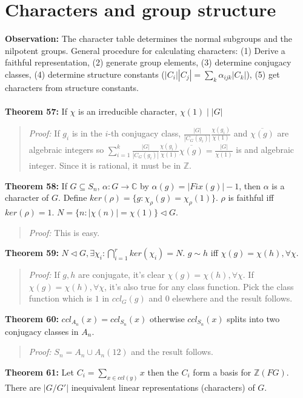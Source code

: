{\section {Characters and group structure}
{\bf Observation:}
The character table determines the normal subgroups and the nilpotent groups.
General procedure for calculating characters: (1) Derive a faithful representation,
(2) generate group elements, (3) determine conjugacy classes, (4) determine structure
constants ($|C_i||C_j|= \sum_k \alpha_{ijk} |C_k|$), (5) get characters from structure
constants.
\\
\\
{\bf Theorem 57:}
If $\chi$ is an irreducible character, $\chi(1) \mid |G|$ 
\begin{quote}
\emph{Proof:}
If $g_i$ is in the $i$-th conjugacy class,
${\frac {|G|} {|C_G(g_i)|}} {\frac {\chi(g_i)} {\chi(1)}}$ and ${\overline {\chi(g)}}$
are algebraic integers so
$\sum_{i=1}^k {\frac {|G|} {|C_G(g_i)|}} {\frac {\chi(g_i)} {\chi(1)}}{\overline {\chi(g)}}
={\frac {|G|} {\chi(1)}}$ is and algebraic integer.  Since it is rational, it must be in
${\mathbb Z}$.
\end{quote}
{\bf Theorem 58:}
If $G \subseteq S_n$, $\alpha: G \rightarrow {\mathbb C}$ by $\alpha(g)= |Fix(g)|-1$,
then $\alpha$ is a character of $G$. Define $ker(\rho)= \{g: \chi_{\rho}(g)= \chi_{\rho}(1) \}$.
$\rho$ is faithful iff $ker(\rho)=1$.  $N= \{n: |\chi(n)|= \chi(1) \} \lhd G$. 
\begin{quote}
\emph{Proof:}  
This is easy.
\end{quote}
{\bf Theorem 59:}
$N \lhd G, \exists \chi_i: \bigcap_{i=1}^r ker(\chi_i) =N$.  
$g \sim h$ iff $\chi(g) = \chi(h), \forall  \chi$.  
\begin{quote}
\emph{Proof:}  
If $g, h$ are conjugate, it's clear $\chi(g) = \chi(h), \forall  \chi$.
If $\chi(g) = \chi(h), \forall  \chi$, it's also true for any class function.  Pick the class
function which is $1$ in $ccl_G(g)$ and $0$ elsewhere and the result follows.
\end{quote}
{\bf Theorem 60:}
$ccl_{A_n}(x)=ccl_{S_n}(x)$ otherwise
$ccl_{S_n}(x)$ splits into two conjugacy classes in $A_n$.
\begin{quote}
\emph{Proof:}  
$S_n = A_n \cup A_n (12)$ and the result follows.
\end{quote}
{\bf Theorem 61:}
Let $C_i= \sum_{x \in ccl(y)} x$ then the $C_i$ form a basis for ${\mathbb Z}(FG)$.
There are $|G/G'|$ inequivalent linear representations (characters) of $G$.
\begin{quote}

\end{quote}}
